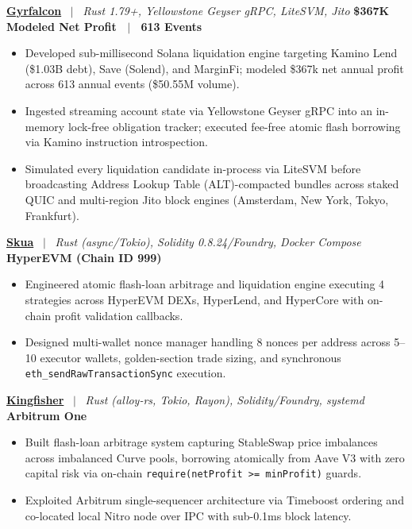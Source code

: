 \documentclass[10pt,a4paper]{article}
\begin{document}
\textbf{\href{https://github.com/Xtley001/gyrfalcon}{Gyrfalcon}} \ $|$ \ \textit{Rust 1.79+, Yellowstone Geyser gRPC, LiteSVM, Jito} \hfill \textbf{\$367K Modeled Net Profit \ $|$ \ 613 Events}
\begin{itemize}
    \item Developed sub-millisecond Solana liquidation engine targeting Kamino Lend (\$1.03B debt), Save (Solend), and MarginFi; modeled \$367k net annual profit across 613 annual events (\$50.55M volume).
    \item Ingested streaming account state via Yellowstone Geyser gRPC into an in-memory lock-free obligation tracker; executed fee-free atomic flash borrowing via Kamino instruction introspection.
    \item Simulated every liquidation candidate in-process via LiteSVM before broadcasting Address Lookup Table (ALT)-compacted bundles across staked QUIC and multi-region Jito block engines (Amsterdam, New York, Tokyo, Frankfurt).
\end{itemize}

\textbf{\href{https://github.com/Xtley001/skua}{Skua}} \ $|$ \ \textit{Rust (async/Tokio), Solidity 0.8.24/Foundry, Docker Compose} \hfill \textbf{HyperEVM (Chain ID 999)}
\begin{itemize}
    \item Engineered atomic flash-loan arbitrage and liquidation engine executing 4 strategies across HyperEVM DEXs, HyperLend, and HyperCore with on-chain profit validation callbacks.
    \item Designed multi-wallet nonce manager handling 8 nonces per address across 5--10 executor wallets, golden-section trade sizing, and synchronous \texttt{eth\_sendRawTransactionSync} execution.
\end{itemize}

\textbf{\href{https://github.com/Xtley001/kingfisher}{Kingfisher}} \ $|$ \ \textit{Rust (alloy-rs, Tokio, Rayon), Solidity/Foundry, systemd} \hfill \textbf{Arbitrum One}
\begin{itemize}
    \item Built flash-loan arbitrage system capturing StableSwap price imbalances across imbalanced Curve pools, borrowing atomically from Aave V3 with zero capital risk via on-chain \texttt{require(netProfit >= minProfit)} guards.
    \item Exploited Arbitrum single-sequencer architecture via Timeboost ordering and co-located local Nitro node over IPC with sub-0.1ms block latency.
\end{itemize}
\end{document}
